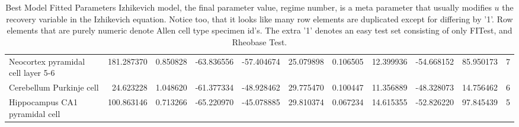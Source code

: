 \begin{table}
{\begin{tabular}{lrrrrrrrrrr}
Neocortex pyramidal cell layer 5-6 &  181.287370 &  0.850828 & -63.836556 & -57.404674 &  25.079898 &  0.106505 &  12.399936 & -54.668152 &   85.950173 &         7 \\
Cerebellum Purkinje cell           &   24.623228 &  1.048620 & -61.377334 & -48.928462 &  29.775470 &  0.100447 &  11.356889 & -48.328073 &   14.756462 &         6 \\
Hippocampus CA1 pyramidal cell     &  100.863146 &  0.713266 & -65.220970 & -45.078885 &  29.810374 &  0.067234 &  14.615355 & -52.826220 &   97.845439 &         5 \\
\bottomrule
\end{tabular}}
\caption[Best Model Fitted Parameters Izhikevich model]{Best Model Fitted Parameters Izhikevich model, the final parameter value, regime number, is a meta parameter that usually modifies $u$ the recovery variable in the Izhikevich equation. Notice too, that it looks like many row elements are duplicated except for differing by '1'. Row elements that are purely numeric denote Allen cell type specimen id's. The extra '1' denotes an easy test set consisting of only FITest, and Rheobase Test.}
\end{table}
\clearpage

